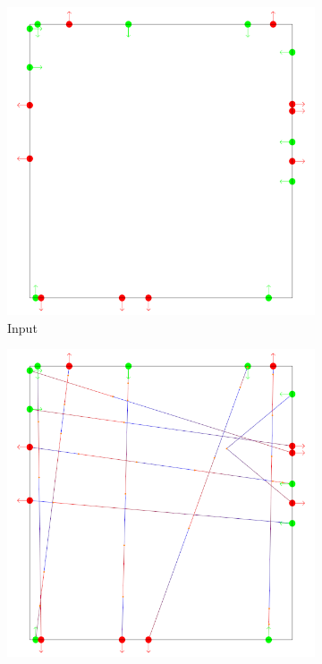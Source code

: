 \begin{figure}[t]
	 \centering
	 \begin{subfigure}[b]{0.24\linewidth}
	 	\includegraphics[width=\linewidth]{images/steps-input.png}
	 	\caption{Input}
	 \end{subfigure}
	 \begin{subfigure}[b]{0.24\linewidth}
	 	\includegraphics[width=\linewidth]{images/steps-connected.png}

\end{subfigure}
\end{figure}
